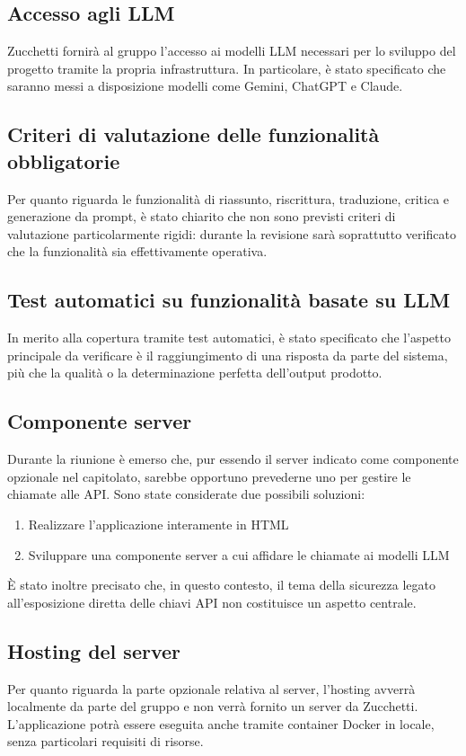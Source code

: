 \documentclass[a4paper, 10pt, colorlinks=true, linkcolor=black, urlcolor=blue, citecolor=blue, hidelinks]{article}
\begin{document}
\subsection{Accesso agli LLM}
Zucchetti fornirà al gruppo l'accesso ai modelli LLM necessari per lo sviluppo del progetto tramite la propria infrastruttura. In particolare, è stato specificato che saranno messi a disposizione modelli come Gemini, ChatGPT e Claude.

\subsection{Criteri di valutazione delle funzionalità obbligatorie}
Per quanto riguarda le funzionalità di riassunto, riscrittura, traduzione, critica e generazione da prompt, è stato chiarito che non sono previsti criteri di valutazione particolarmente rigidi: durante la revisione sarà soprattutto verificato che la funzionalità sia effettivamente operativa.

\subsection{Test automatici su funzionalità basate su LLM}
In merito alla copertura tramite test automatici, è stato specificato che l'aspetto principale da verificare è il raggiungimento di una risposta da parte del sistema, più che la qualità o la determinazione perfetta dell'output prodotto.

\subsection{Componente server}
Durante la riunione è emerso che, pur essendo il server indicato come componente opzionale nel capitolato, sarebbe opportuno prevederne uno per gestire le chiamate alle API. Sono state considerate due possibili soluzioni:
\begin{enumerate}
    \item Realizzare l'applicazione interamente in HTML
    \item Sviluppare una componente server a cui affidare le chiamate ai modelli LLM
\end{enumerate}
È stato inoltre precisato che, in questo contesto, il tema della sicurezza legato all'esposizione diretta delle chiavi API non costituisce un aspetto centrale.

\subsection{Hosting del server}
Per quanto riguarda la parte opzionale relativa al server, l'hosting avverrà localmente da parte del gruppo e non verrà fornito un server da Zucchetti. L'applicazione potrà essere eseguita anche tramite container Docker in locale, senza particolari requisiti di risorse.
\end{document}
